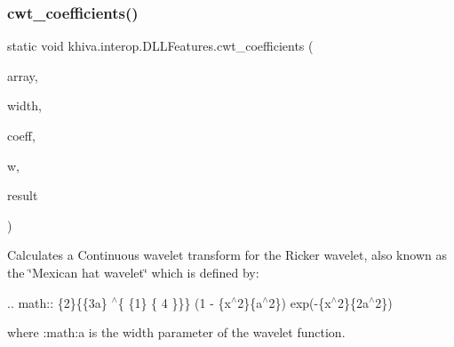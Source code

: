 \mbox{\label{classkhiva_1_1interop_1_1_d_l_l_features_acf0dfe79937a46d9cfa3125d24b440d7}} 
\subsubsection{\texorpdfstring{cwt\+\_\+coefficients()}{cwt\_coefficients()}}
{\footnotesize\ttfamily static void khiva.\+interop.\+D\+L\+L\+Features.\+cwt\+\_\+coefficients (\begin{DoxyParamCaption}\item[{\mbox{[}\+In\mbox{]} ref Int\+Ptr}]{array,  }\item[{\mbox{[}\+In\mbox{]} ref Int\+Ptr}]{width,  }\item[{\mbox{[}\+In\mbox{]} ref int}]{coeff,  }\item[{\mbox{[}\+In\mbox{]} ref int}]{w,  }\item[{\mbox{[}\+Out\mbox{]} out Int\+Ptr}]{result }\end{DoxyParamCaption})\hspace{0.3cm}{\ttfamily [static]}}



Calculates a Continuous wavelet transform for the Ricker wavelet, also known as the \char`\"{}\+Mexican hat wavelet\char`\"{} which is defined by\+: 

.. math\+:\+: \{2\}\{\{3a\} $^\wedge$\{ \{1\} \{ 4 \}\}\} (1 -\/ \{x$^\wedge$2\}\{a$^\wedge$2\}) exp(-\/\{x$^\wedge$2\}\{2a$^\wedge$2\})

where \+:math\+:{\ttfamily a} is the width parameter of the wavelet function.


